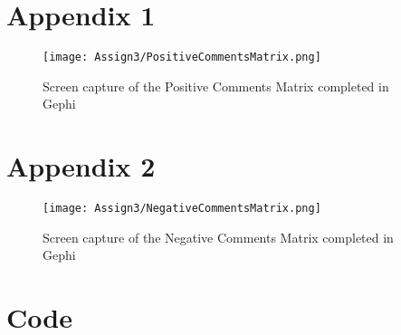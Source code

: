\documentclass{article}
\begin{document}
\newpage

\printbibliography

\newpage

\appendix

\section{Appendix 1}
\label{sec:PositiveVisualization}

\begin{figure}[H]
\caption{Screen capture of the Positive Comments Matrix completed in Gephi}
\begin{center}
\texttt{[image: Assign3/PositiveCommentsMatrix.png]}
\label{positivecommentsmatrix}
\end{center}
\end{figure}

\newpage

\section{Appendix 2}
\label{sec:NegativeVisualization}

\begin{figure}[H]
\caption{Screen capture of the Negative Comments Matrix completed in Gephi}
\begin{center}
\texttt{[image: Assign3/NegativeCommentsMatrix.png]}
\label{negativecommentsmatrix}
\end{center}
\end{figure}

\newpage

\section{Code}
\end{document}

